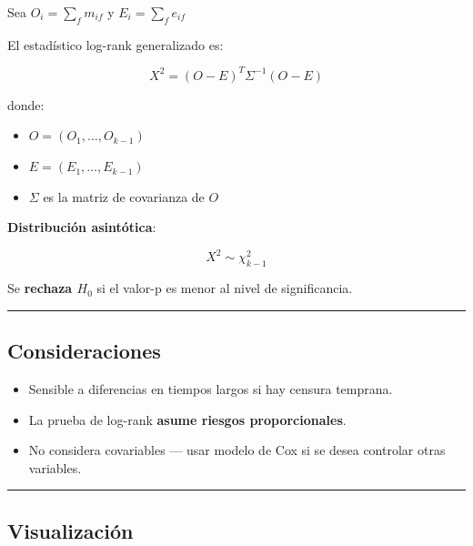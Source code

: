 \documentclass[
]{article}
\providecommand{\tightlist}{%
  \setlength{\itemsep}{0pt}\setlength{\parskip}{0pt}}
\begin{document}
Sea \(O_i = \sum_f m_{if}\) y \(E_i = \sum_f e_{if}\)

El estadístico log-rank generalizado es:

\[
X^2 = (O - E)^T \Sigma^{-1} (O - E)
\]

donde:

\begin{itemize}
\tightlist
\item
  \(O = (O_1, \dots, O_{k-1})\)\\
\item
  \(E = (E_1, \dots, E_{k-1})\)\\
\item
  \(\Sigma\) es la matriz de covarianza de \(O\)
\end{itemize}

\textbf{Distribución asintótica}:

\[
X^2 \sim \chi^2_{k - 1}
\]

Se \textbf{rechaza \(H_0\)} si el valor-p es menor al nivel de
significancia.

\begin{center}\rule{0.5\linewidth}{0.5pt}\end{center}

\subsection{Consideraciones}\label{consideraciones}

\begin{itemize}
\tightlist
\item
  Sensible a diferencias en tiempos largos si hay censura temprana.
\item
  La prueba de log-rank \textbf{asume riesgos proporcionales}.
\item
  No considera covariables --- usar modelo de Cox si se desea controlar
  otras variables.
\end{itemize}

\begin{center}\rule{0.5\linewidth}{0.5pt}\end{center}

\subsection{Visualización}\label{visualizaciuxf3n}
\end{document}
